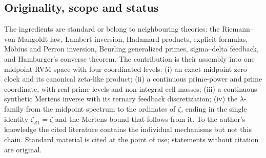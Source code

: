 \documentclass[11pt,reqno]{amsart}
\numberwithin{equation}{section}
\theoremstyle{plain}
\theoremstyle{definition}
\theoremstyle{remark}
\begin{document}
\subsection{Originality, scope and status}
\label{subsec:status}

The ingredients are standard or belong to neighbouring theories: the Riemann--von Mangoldt law, Lambert inversion, Hadamard products, explicit formulas, M\"obius and Perron inversion, Beurling generalized primes, sigma--delta feedback, and Hamburger's converse theorem.  The contribution is their assembly into one midpoint RVM space with four coordinated levels: (i) an exact midpoint zero clock and its canonical zeta-like product; (ii) a continuous prime-power and prime coordinate, with real prime levels and non-integral cell masses; (iii) a continuous synthetic Mertens inverse with its ternary feedback discretization; (iv) the $\lambda$-family from the midpoint spectrum to the ordinates of $\zeta$, ending in the single identity $\zeta_{Z1}=\zeta$ and the Mertens bound that follows from it.  To the author's knowledge the cited literature contains the individual mechanisms but not this chain.  Standard material is cited at the point of use; statements without citation are original.
\end{document}
